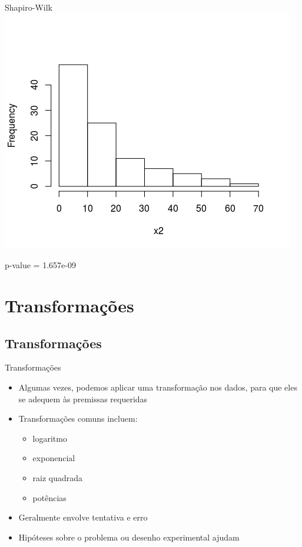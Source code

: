 \documentclass{beamer}
\begin{document}
\begin{frame}{Shapiro-Wilk}
  \centering
  \includegraphics[width=.8\textwidth]{Nao_Param/lognormal1-h}

  p-value = 1.657e-09
\end{frame}

\section{Transformações}

\subsection{Transformações}

\begin{frame}{Transformações}
  \begin{itemize}
  \item Algumas vezes, podemos aplicar uma transformação nos dados, para que eles se adequem às premissas requeridas
  \item Transformações comuns incluem:
    \begin{itemize}
    \item<2-> logaritmo
    \item<2-> exponencial
    \item<2-> raiz quadrada
    \item<2-> potências
    \end{itemize}
  \item Geralmente envolve tentativa e erro
  \item Hipóteses sobre o problema ou desenho experimental ajudam
  \end{itemize}
\end{frame}
\end{document}
